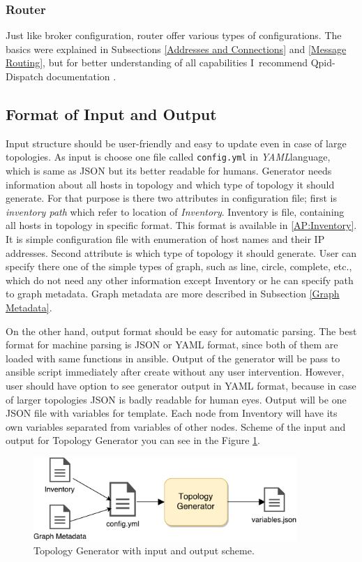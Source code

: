 \subsubsection*{Router}
Just like broker configuration, router offer various types of configurations. The basics were explained in Subsections \ref{Addresses and Connections} and \ref{Message Routing}, but for better understanding of all capabilities I~recommend Qpid-Dispatch documentation \cite{RH:Interconnect}. 

\subsection{Format of Input and Output}
Input structure should be user-friendly and easy to update even in case of large topologies. As input is choose one file called \texttt{config.yml} in \emph{YAML}\footnotemark  language, which is same as JSON but its better readable for humans. Generator needs information about all hosts in topology and which type of topology it should generate. For that purpose is there two attributes in configuration file; first is \emph{inventory path} which refer to location of \emph{Inventory}. Inventory is file, containing all hosts in topology in specific format. This format is available in \ref{AP:Inventory}. It is simple configuration file with enumeration of host names and their IP addresses. Second attribute is which type of topology it should generate. User can specify there one of the simple types of graph, such as line, circle, complete, etc., which do not need any other information except Inventory or he can specify path to graph metadata. Graph metadata are more described in Subsection \ref{Graph Metadata}.

On the other hand, output format should be easy for automatic parsing. The best format for machine parsing is JSON or YAML format, since both of them are loaded with same functions in ansible. Output of the generator will be pass to ansible script immediately after create without any user intervention. However, user should have option to see generator output in YAML format, because in case of larger topologies JSON is badly readable for human eyes. Output will be one JSON file with variables for template. Each node from Inventory will have its own variables separated from variables of other nodes. Scheme of the input and output for Topology Generator you can see in the Figure \ref{fig:generator}.

\begin{figure}[H]
  \centering
  \includegraphics[width=10cm]{obrazky-figures/generator.pdf}
  \caption{Topology Generator with input and output scheme.}
  \label{fig:generator}
\end{figure}

